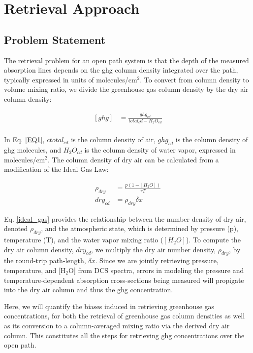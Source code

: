 \documentclass[amt, manuscript]{copernicus}
\begin{document}
\section{Retrieval Approach}
\subsection{Problem Statement}
The retrieval problem for an open path system is that the depth of the measured absorption lines depends on the ghg column density integrated over the path, typically expressed in units of molecules/cm$^2$. To convert from column density to volume mixing ratio, we divide the greenhouse gas column density by the dry air column density:

\begin{align}
  \label{EQ1}
  [ghg] &= \frac{ghg_{cd}}{total_cd{} - H_2O_{cd}} \\
\end{align}

In Eq. \ref{EQ1}, $ctotal_{cd}$ is the column density of air, $ghg_{cd}$ is the column density of ghg molecules, and $H_2O_{cd}$ is the column density of water vapor, expressed in molecules/cm$^2$. The column density of dry air can be calculated from a modification of the Ideal Gas Law:

\begin{align}
  \rho_{dry} &= \frac{p(1-[H_2O])}{rT} \label{ideal_gas}\\
  dry_{cd} &= \rho_{dry}\delta x \label{path_amount}
\end{align}

Eq. \ref{ideal_gas} provides the relationship between the number density of dry air, denoted $\rho_{dry}$, and the atmospheric state, which is determined by pressure (p), temperature (T), and the water vapor mixing ratio ($[H_2O]$). To compute the dry air column density, $dry_{cd}$, we multiply the dry air number density, $\rho_{dry}$, by the round-trip path-length, $\delta x$. Since we are jointly retrieving pressure, temperature, and [H$_2$O] from DCS spectra, errors in modeling the pressure and temperature-dependent absorption cross-sections being measured will propigate into the dry air column and thus the ghg concentration.

Here, we will quantify the biases induced in retrieving greenhouse gas concentrations, for both the retrieval of greenhouse gas column densities as well as its conversion to a column-averaged mixing ratio via the derived dry air column. This constitutes all the steps for retrieving ghg concentrations over the open path.
\end{document}
